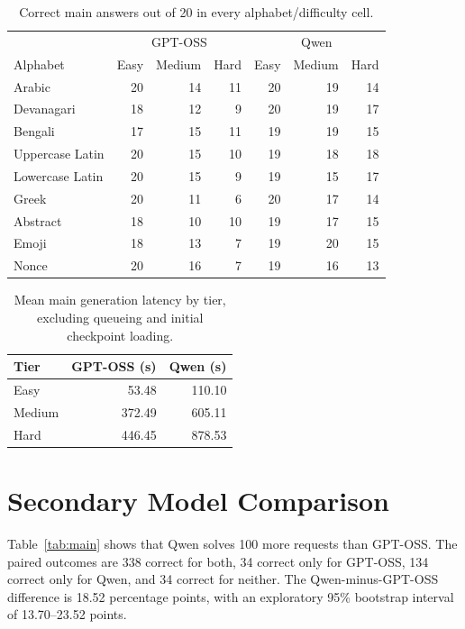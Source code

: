 \documentclass[11pt]{article}
\begin{document}
\begin{table}[t]
\centering\small
\begin{tabular}{lrrrrrr}
\toprule
& \multicolumn{3}{c}{GPT-OSS} & \multicolumn{3}{c}{Qwen}\\
Alphabet & Easy & Medium & Hard & Easy & Medium & Hard\\
\midrule
Arabic & 20 & 14 & 11 & 20 & 19 & 14\\
Devanagari & 18 & 12 & 9 & 20 & 19 & 17\\
Bengali & 17 & 15 & 11 & 19 & 19 & 15\\
Uppercase Latin & 20 & 15 & 10 & 19 & 18 & 18\\
Lowercase Latin & 20 & 15 & 9 & 19 & 15 & 17\\
Greek & 20 & 11 & 6 & 20 & 17 & 14\\
Abstract & 18 & 10 & 10 & 19 & 17 & 15\\
Emoji & 18 & 13 & 7 & 19 & 20 & 15\\
Nonce & 20 & 16 & 7 & 19 & 16 & 13\\
\bottomrule
\end{tabular}
\caption{Correct main answers out of 20 in every alphabet/difficulty cell.}
\label{tab:tiers}
\end{table}

\begin{table}[t]
\centering\small
\begin{tabular}{lrr}
\toprule
Tier & GPT-OSS (s) & Qwen (s)\\
\midrule
Easy & 53.48 & 110.10\\
Medium & 372.49 & 605.11\\
Hard & 446.45 & 878.53\\
\bottomrule
\end{tabular}
\caption{Mean main generation latency by tier, excluding queueing and initial checkpoint loading.}
\label{tab:latency}
\end{table}

\section{Secondary Model Comparison}\label{app:models}
Table~\ref{tab:main} shows that Qwen solves 100 more requests than GPT-OSS. The paired outcomes are 338 correct for both, 34 correct only for GPT-OSS, 134 correct only for Qwen, and 34 correct for neither. The Qwen-minus-GPT-OSS difference is 18.52 percentage points, with an exploratory 95\% bootstrap interval of 13.70--23.52 points.
\end{document}
